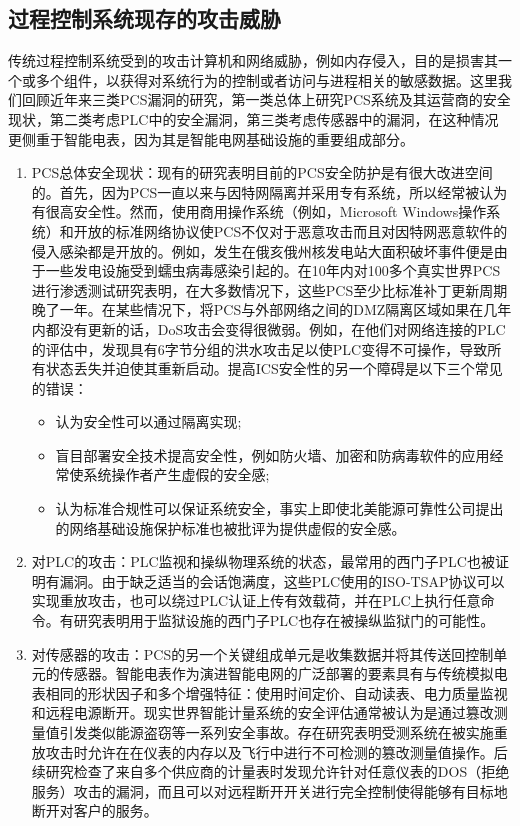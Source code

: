 \subsection{过程控制系统现存的攻击威胁}

传统过程控制系统受到的攻击计算机和网络威胁，例如内存侵入，目的是损害其一个或多个组件，以获得对系统行为的控制或者访问与进程相关的敏感数据。这里我们回顾近年来三类PCS漏洞的研究，第一类总体上研究PCS系统及其运营商的安全现状，第二类考虑PLC中的安全漏洞，第三类考虑传感器中的漏洞，在这种情况更侧重于智能电表，因为其是智能电网基础设施的重要组成部分。

\begin{enumerate}
\item PCS总体安全现状：现有的研究\parencite{Byres03}表明目前的PCS安全防护是有很大改进空间的。首先，因为PCS一直以来与因特网隔离并采用专有系统，所以经常被认为有很高安全性。然而，使用商用操作系统（例如，Microsoft Windows操作系统）和开放的标准网络协议使PCS不仅对于恶意攻击而且对因特网恶意软件的侵入感染都是开放的。例如，发生在俄亥俄州核发电站大面积破坏事件便是由于一些发电设施受到蠕虫病毒感染引起的。在10年内对100多个真实世界PCS进行渗透测试研究表明，在大多数情况下，这些PCS至少比标准补丁更新周期晚了一年。在某些情况下，将PCS与外部网络之间的DMZ隔离区域如果在几年内都没有更新的话，DoS攻击会变得很微弱。例如，在他们对网络连接的PLC的评估中，发现具有6字节分组的洪水攻击足以使PLC变得不可操作，导致所有状态丢失并迫使其重新启动。提高ICS安全性的另一个障碍是以下三个常见的错误\parencite{Pietre11}：
\begin{itemize}
\item 认为安全性可以通过隔离实现;
\item 盲目部署安全技术提高安全性，例如防火墙、加密和防病毒软件的应用经常使系统操作者产生虚假的安全感;
\item 认为标准合规性可以保证系统安全，事实上即使北美能源可靠性公司提出的网络基础设施保护标准也被批评为提供虚假的安全感\parencite{Weiss09}。
\end{itemize}
\item 对PLC的攻击：PLC监视和操纵物理系统的状态，最常用的西门子PLC也被证明有漏洞。由于缺乏适当的会话饱满度，这些PLC使用的ISO-TSAP协议可以实现重放攻击\parencite{Beresford11}，也可以绕过PLC认证上传有效载荷，并在PLC上执行任意命令。有研究表明用于监狱设施的西门子PLC也存在被操纵监狱门的可能性\parencite{Newman11}。
\item 对传感器的攻击：PCS的另一个关键组成单元是收集数据并将其传送回控制单元的传感器。智能电表作为演进智能电网的广泛部署的要素具有与传统模拟电表相同的形状因子\parencite{Blumsack12}和多个增强特征：使用时间定价\parencite{King01}、自动读表、电力质量监视和远程电源断开。现实世界智能计量系统的安全评估通常被认为是通过篡改测量值引发类似能源盗窃等一系列安全事故\parencite{McLaughlin092}。存在研究表明受测系统在被实施重放攻击时允许在在仪表的内存以及飞行中进行不可检测的篡改测量值操作。后续研究检查了来自多个供应商的计量表时发现允许针对任意仪表的DOS（拒绝服务）攻击的漏洞，而且可以对远程断开开关进行完全控制使得能够有目标地断开对客户的服务\parencite{McLaughlin102}。
\end{enumerate}

